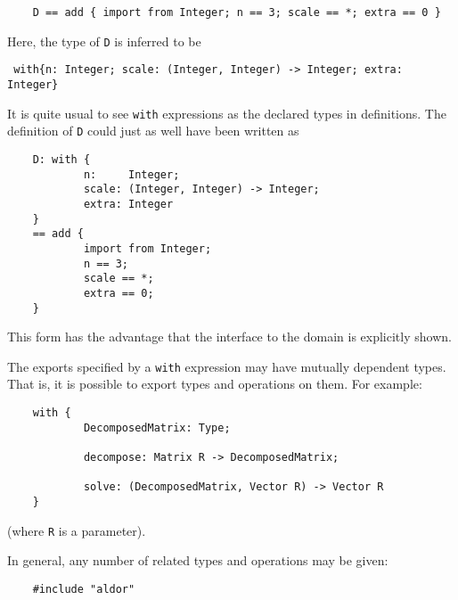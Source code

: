 {\begin{small}
\begin{verbatim}
    D == add { import from Integer; n == 3; scale == *; extra == 0 }
\end{verbatim}
\end{small}

Here, the type of \verb"D" is inferred to be

\begin{small}
\begin{verbatim}
 with{n: Integer; scale: (Integer, Integer) -> Integer; extra: Integer}
\end{verbatim}
\end{small}

It is quite usual to see \verb"with" expressions as the declared
types in definitions.  The definition of \verb"D" could just as
well have been written as

\begin{small}
\begin{verbatim}
    D: with {
            n:     Integer;
            scale: (Integer, Integer) -> Integer;
            extra: Integer
    }
    == add {
            import from Integer;
            n == 3;
            scale == *;
            extra == 0;
    }
\end{verbatim}
\end{small}

This form has the advantage that the interface to the domain is
explicitly shown.

The exports specified by a \verb"with" expression may have mutually
dependent types.  That is, it is possible to export types
and operations on them.  For example:

\begin{small}
\begin{verbatim}
    with {
            DecomposedMatrix: Type;

            decompose: Matrix R -> DecomposedMatrix;

            solve: (DecomposedMatrix, Vector R) -> Vector R
    }
\end{verbatim}
\end{small}

(where \verb"R" is a parameter).

In general, any number of related types and operations may be given:

\begin{small}
\begin{verbatim}
    #include "aldor"


\end{verbatim}
\end{small}}
